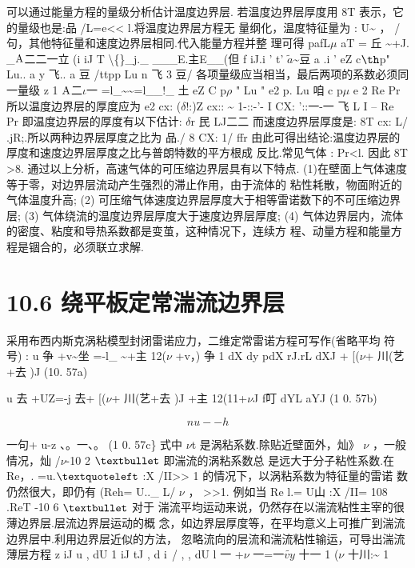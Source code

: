 可以通过能量方程的量级分析估计温度边界层. 若温度边界层厚度用 8T 表示，它的量级也是:品 /L=e<< l.将温度边界层方程无 量纲化，温度特征量为 : U\textasciitilde{} ， / 句，其他特征量和速度边界层相同.代入能量方程并整 理可得 pafL$\mu$ aT = 丘 \textasciitilde{}+J. \_${\rm A}$二二一立 (i iJ T \textbackslash\{\}\_j.\_ \_\_\_E.主E\_\_(但 f iJ.i ' t' $\tilde{a}$\textasciitilde{}豆 a .i ' eZ c${\rm þ}$p" Lu.. a y 飞.. a 豆 /ttpp Lu n 飞 3 豆/ 各项量级应当相当，最后两项的系数必须同一量级 z 1 ${\rm A}$二$\iota$一 =l\_\textasciitilde{}\textasciitilde{}=l\_\_!\_ 土 eZ C p$\rho$ " Lu " e2 p. Lu 咱 c p$\mu$ e 2 Re Pr 所以温度边界层的厚度应为 e2 cx: ($\delta$!:)Z cx:: \textasciitilde{} 1-::-'- I CX: '::一-一 飞 L I -- Re Pr 即温度边界层的厚度有以下估计: $\delta$r 民 LJ二二 而速度边界层厚度是: 8T cx: L/ .jR;.所以两种边界层厚度之比为 品./ 8 CX: 1/ ffr 由此可得出结论:温度边界层的厚度和速度边界层厚度之比与普朗特数的平方根成 反比.常见气体 : Pr<l. 因此 8T >8. 通过以上分析，高速气体的可压缩边界层具有以下特点. (1)在壁面上气体速度等于零，对边界层流动产生强烈的滞止作用，由于流体的 粘性耗散，物面附近的气体温度升高; (2) 可压缩气体速度边界层厚度大于相等雷诺数下的不可压缩边界层; (3) 气体绕流的温度边界层厚度大于速度边界层厚度; (4) 气体边界层内，流体的密度、粘度和导热系数都是变茧，这种情况下，连续方 程、动量方程和能量方程是锢合的，必须联立求解.

\section*{10.6  绕平板定常湍流边界层}

采用布西内斯克涡粘模型封闭雷诺应力，二维定常雷诺方程可写作(省略平均 符号) : u 争 +v\textasciitilde{}坐 =-l\_ \textasciitilde{}+主 12($\nu$ +v，) 争 1 dX dy pdX rJ.rL dXJ + [($\nu$+ 川(艺+去 )J (10. 57a)

u 去 +UZ=-j 去+ [($\nu$+ 川(艺+去 )J +主 12(11+$\nu$J f叮 dYL aYJ (1 0. 57b)

\[nu --h\]

一句+ u-z 、。一、。 (1 0. 57c\} 式中 $\nu$t 是涡粘系数.除贴近壁面外，灿》 $\nu$ ，一般情况，灿 /$\nu$-10 2 ${\rm •}$ 即湍流的涡粘系数总 是远大于分子粘性系数.在 Re，. =u.${\rm ‘}$ :X /II>> 1 的情况下，以涡粘系数为特征量的雷诺 数仍然很大，即仍有 (Reh= U..\_ L/ $\nu$ ， >>1. 例如当 Re l.= U山 :X /II= 108 .ReT -10 6 ${\rm •}$ 对于 湍流平均运动来说，仍然存在以湍流粘性主宰的很薄边界层.层流边界层运动的概 念，如边界层厚度等，在平均意义上可推广到湍流边界层中.利用边界层近似的方法， 忽略流向的层流和湍流粘性输运，可导出湍流薄层方程 z iJ u , dU 1 iJ tJ , d ${\rm i}$ / , , dU l 一 +$\nu$ 一=一$\tilde{vy}$ 十一 1 ($\nu$ 十川:\textasciitilde{} 1

